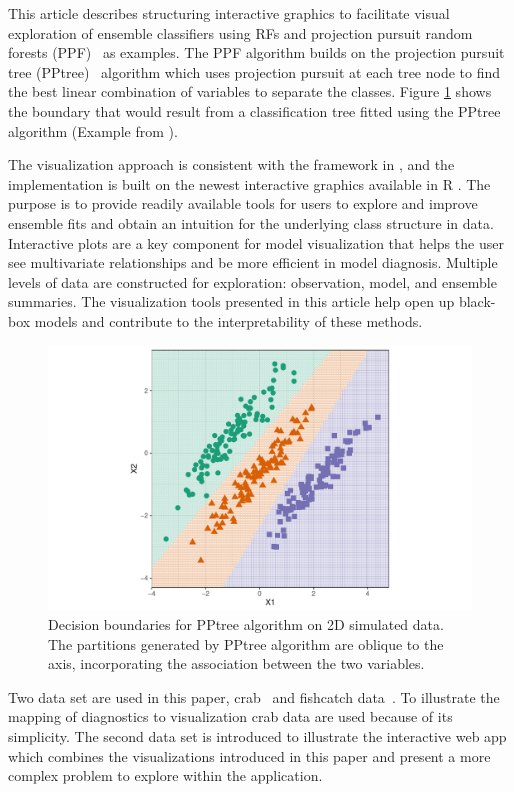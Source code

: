 \documentclass[smallextended,natbib]{svjour3}\usepackage[]{graphicx}\usepackage[]{xcolor}
\makeatletter
\def\maxwidth{ %
  \ifdim\Gin@nat@width>\linewidth
    \linewidth
  \else
    \Gin@nat@width
  \fi
}
\newenvironment{knitrout}{}{} %
\makeatother
\begin{document}
This article describes structuring interactive graphics to facilitate visual exploration of ensemble classifiers using RFs and projection pursuit random forests (PPF)~\citep{da2021projection} as examples. The PPF algorithm builds on the projection pursuit tree (PPtree)~\citep{lee2013pptree} algorithm which uses projection pursuit at each tree node to find the best linear combination of variables to separate the classes. Figure \ref{bounds} shows the boundary that would result from a classification tree fitted using the PPtree algorithm (Example from \citep{da2021projection}).

The visualization approach is consistent with the framework in \cite{wickham2015visualizing}, and the implementation is built on the newest interactive graphics available in R \citep{RCore}. The purpose is to provide readily available tools for users to explore and improve ensemble fits and obtain an intuition for the underlying class structure in data. Interactive plots are a key component for model visualization that helps the user see multivariate relationships and be more efficient in model diagnosis. Multiple levels of data are constructed for exploration: observation, model, and ensemble summaries.
The visualization tools presented in this article help open up black-box models and contribute to the interpretability of these methods.



\begin{figure}[!t]
\begin{knitrout}
\color{fgcolor}
\includegraphics[width=\maxwidth]{boundss-1} 
\end{knitrout}
 \vspace*{-0.3cm}
 \caption{Decision boundaries for PPtree algorithm on 2D simulated data. The partitions generated by PPtree algorithm are oblique to the axis, incorporating the association between the two variables.\label{bounds}}
\end{figure}
Two data set are used in this paper, crab~\citep{CM74} and fishcatch data~\citep{fishcatch}. To illustrate the mapping of diagnostics to visualization crab data are used because of its simplicity. The second data set is introduced to illustrate the interactive web app which combines the visualizations introduced in this paper and present a more complex problem to explore within the application. 
\end{document}

